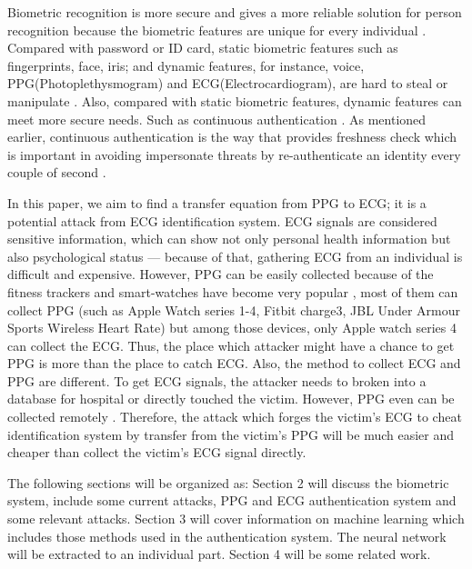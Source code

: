\documentclass[a4paper,12pt]{article}
\begin{document}
Biometric recognition is more secure and gives a more reliable solution for person recognition because the biometric features are unique for every individual \autocite{Jain:2011bio}. Compared with password or ID card, static biometric features such as fingerprints, face, iris; and dynamic features, for instance, voice, PPG(Photoplethysmogram) and ECG(Electrocardiogram), are hard to steal or manipulate \autocite{Agrafioti:2011heart}. Also, compared with static biometric features, dynamic features can meet more secure needs. Such as continuous authentication \autocite{Agrafioti:2011medical}. As mentioned earlier, continuous authentication is the way that provides freshness check which is important in avoiding impersonate threats by re-authenticate an identity every couple of second \autocite{Agrafioti:2011heart}.

In this paper, we aim to find a transfer equation from PPG to ECG; it is a potential attack from ECG identification system. ECG signals are considered sensitive information, which can show not only personal health information but also psychological status \autocite{Damousis:2008unobtrusive} — because of that, gathering ECG from an individual is difficult and expensive. However, PPG can be easily collected because of the fitness trackers and smart-watches have become very popular \autocite{Blasco:2018feasibility}, most of them can collect PPG (such as Apple Watch series 1-4, Fitbit charge3, JBL Under Armour Sports Wireless Heart Rate) but among those devices, only Apple watch series 4 can collect the ECG. Thus, the place which attacker might have a chance to get PPG is more than the place to catch ECG. Also, the method to collect ECG and PPG are different. To get ECG signals, the attacker needs to broken into a database for hospital or directly touched the victim. However, PPG even can be collected remotely \autocite{Verkruysse2008remotePPG}. Therefore, the attack which forges the victim's ECG to cheat identification system by transfer from the victim's PPG will be much easier and cheaper than collect the victim's ECG signal directly.

The following sections will be organized as: Section 2 will discuss the biometric system, include some current attacks, PPG and ECG authentication system and some relevant attacks. Section 3 will cover information on machine learning which includes those methods used in the authentication system. The neural network will be extracted to an individual part. Section 4 will be some related work.
\end{document}
